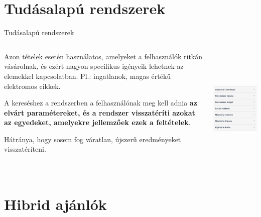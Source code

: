 \documentclass[english, aspectratio=169]{beamer}
\makeatletter
\let\origtableofcontents=\tableofcontents
\def\tableofcontents{\@ifnextchar[{\origtableofcontents}{\gobbletableofcontents}}
\def\gobbletableofcontents#1{\origtableofcontents}
\makeatother
\begin{document}
\section{Tudásalapú rendszerek}

\begin{frame}
\tableofcontents[currentsection]
\end{frame}

\begin{frame}{Tudásalapú rendszerek}
\begin{columns}
\begin{column}{.5\textwidth}
Azon tételek esetén használatos, amelyeket a felhasználók ritkán vásárolnak, és ezért nagyon specifikus igényeik lehetnek az elemekkel kapcsolatban. Pl.: ingatlanok, magas értékű elektromos cikkek.\par\smallskip
A kereséshez a rendszerben a felhasználónak meg kell adnia \textbf{az elvárt paramétereket, és a rendszer visszatéríti azokat az egyedeket, amelyekre jellemzőek ezek a feltételek}.\par\smallskip
Hátránya, hogy sosem fog váratlan, újszerű eredményeket visszatéríteni. 
\end{column}
\begin{column}{.5\textwidth}
\begin{center}
\includegraphics[width=7cm, height=6cm, keepaspectratio]{images/recommender_3.png}
\end{center}
\end{column}
\end{columns}
\end{frame}

\section{Hibrid ajánlók}

\begin{frame}
\tableofcontents[currentsection]
\end{frame}
\end{document}

